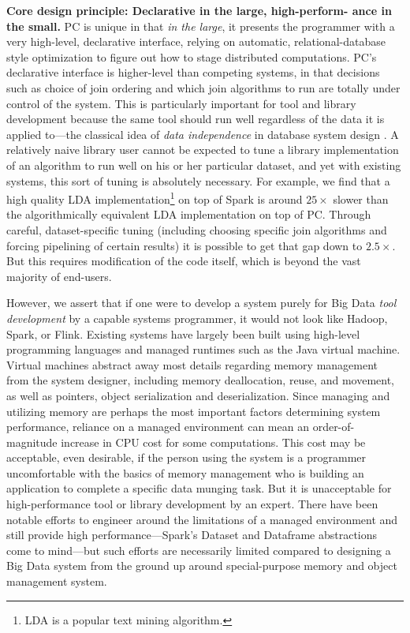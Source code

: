 \vspace{5 pt}
\noindent
\textbf{Core design principle: Declarative in the large, high-perform-
  ance in the small.}
PC is unique in that \emph{in the large}, 
it presents the programmer with a very high-level,
declarative interface, relying on automatic, 
relational-database style optimization \cite{chaudhuri1998overview} to figure out how to stage
distributed computations.  
PC's declarative interface is higher-level than competing systems, in that decisions such as choice of join ordering and which
join algorithms to run are
totally under control of the system. 
This is particularly important for tool and library development because the same tool should run well regardless of the data
it is applied to---the classical idea of \emph{data independence} in database system design \cite{stonebraker1990third}.
A relatively naive library user cannot be expected to tune a library implementation of an algorithm to run
well on his or her particular dataset, and yet with existing systems, this sort of tuning
is absolutely necessary.  For example, we find
that a high quality LDA implementation\footnote{LDA \cite{blei2003latent} is a popular text mining algorithm.}
on top of Spark is around $25\times$ slower than the algorithmically equivalent LDA
implementation on top of PC.  Through careful, dataset-specific tuning (including choosing specific join algorithms and
forcing pipelining of certain results) it is possible to get that gap down to $2.5\times$.  But this requires modification of the
code itself, which is beyond the vast majority of end-users.

However, we assert that if one were to develop a system purely for Big Data \emph{tool development} 
by a capable systems programmer,
it would not look like Hadoop, Spark, or Flink.
Existing systems have largely been built using high-level programming languages and managed runtimes such as the Java 
virtual machine.  Virtual machines abstract away
most details regarding memory management
from the system designer, including memory deallocation, reuse, and movement, as well as pointers,
object serialization and deserialization.
Since managing and utilizing memory are perhaps the most important factors determining system performance, reliance
on a managed environment can mean an order-of-magnitude increase in CPU cost for some computations.  
This cost may be acceptable, even desirable, if the person using the system
is a programmer uncomfortable with the basics of memory management who is
building an application to complete a specific data munging task.  But it is unacceptable for high-performance tool
or library development by an expert.
There have been notable efforts to engineer around the limitations of a managed environment and still provide
high performance---Spark's Dataset and
Dataframe abstractions come to mind---but such efforts are necessarily limited compared to
designing a Big Data system from the ground up around special-purpose
memory and object management system.

